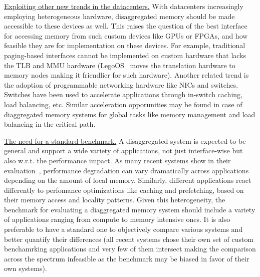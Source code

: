 \vspace{3pt}
\noindent \uline{Exploiting other new trends 
in the datacenters.}
With datacenters increasingly employing heterogeneous 
hardware, disaggregated memory should be made accessible 
to these devices as well. This raises the question of 
the best interface for accessing memory from such  
custom devices like GPUs or FPGAs, and how feasible they 
are for implementation on these devices. For example, 
traditional paging-based interfaces cannot be 
implemented on custom hardware that lacks the TLB and MMU 
hardware (LegoOS~\cite{legoos} moves the translation hardware 
to memory nodes making it friendlier for such hardware). 
Another related trend is the 
adoption of programmable networking hardware like 
NICs and switches. Switches have been used to 
accelerate applications through in-switch caching, load
balancing, etc. Similar acceleration opporunities may be found 
in case of diaggregated memory systems for global tasks like 
memory management and load balancing in the critical path.



\vspace{3pt}
\noindent \uline{The need for a standard benchmark.}
A disaggregated system is expected to be general and support
a wide variety of applications, not just interface-wise but 
also w.r.t. the performance impact. As many recent 
systems show in their evaluation~\cite{netdisagg,legoos,fastswap}, 
performance degradation can vary dramatically across 
applications depending on the amount of local memory.
Similarly, different applications react differently to 
perfomance optimizations like caching and prefetching,
based on their memory access and locality patterns. 
Given this heterogeneity, the benchmark for evaluating a 
diaggregated memory system should include a variety of 
applications ranging from compute to memory intensive ones. 
It is also preferable to have a standard one to objectively 
compare various systems and better quantify their differences 
(all recent systems chose their own set of custom benchamrking 
applications and very few of them intersect making the 
comparison across the spectrum infeasible as the benchmark
may be biased in favor of their own systems). 


%